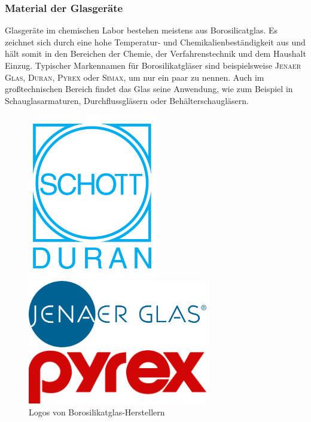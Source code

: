 \subsubsection{Material der Glasgeräte}
Glasgeräte im chemischen Labor bestehen meistens aus Borosilicatglas. Es zeichnet sich durch eine hohe Temperatur- und Chemikalienbeständigkeit aus und hält somit in den Bereichen der Chemie, der Verfahrenstechnik und dem Haushalt Einzug. Typischer Markennamen für Borosilikatgläser sind beispielsweise \textsc{Jenaer Glas}, \textsc{Duran}, \textsc{Pyrex} oder \textsc{Simax}, um nur ein paar zu nennen.
Auch im großtechnischen Bereich findet das Glas seine Anwendung, wie zum Beispiel in Schauglasarmaturen, Durchflussgläsern oder Behälterschaugläsern. 
\begin{figure}[h!]
		\centering
		\begin{minipage}{0.3\textwidth}
			\includegraphics[width=0.5\textwidth]{img/logo_duran}
		\end{minipage}
		\begin{minipage}{0.30\textwidth}
			\includegraphics[width=0.7\textwidth]{img/logo_jenaerglas}
		\end{minipage}
		\begin{minipage}{0.30\textwidth}
			\includegraphics[width=0.7\textwidth]{img/logo_pyrex}
		\end{minipage}
		\caption{Logos von Borosilikatglas-Herstellern}
\end{figure}
\FloatBarrier

